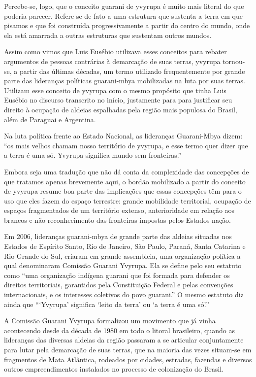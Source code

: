 Percebe-se, logo, que o conceito guarani de yvyrupa é muito mais literal
do que poderia parecer. Refere-se de fato a uma estrutura que sustenta
a terra em que pisamos e que foi construída progressivamente a partir
do centro do mundo, onde ela está amarrada a outras estruturas que
sustentam outros mundos.

Assim como vimos que Luis Eusébio utilizava esses conceitos para rebater
argumentos de pessoas contrárias à demarcação de suas terras, yvyrupa
tornou-se, a partir das últimas décadas, um termo utilizado
frequentemente por grande parte das lideranças políticas guarani-mbya
mobilizadas na luta por suas terras. Utilizam esse conceito de yvyrupa
com o mesmo propósito que tinha Luis Eusébio no discurso transcrito no 
início, justamente para para justificar seu direito à ocupação de
aldeias espalhadas pela região mais populosa do Brasil, além de
Paraguai e Argentina.

Na luta política frente ao Estado Nacional, as lideranças Guarani-Mbya
dizem: ``os mais velhos chamam nosso território de yvyrupa, e esse termo
quer dizer que a terra é uma só. Yvyrupa significa mundo sem
fronteiras.''

Embora seja uma tradução que não dá conta da complexidade das concepções
de que tratamos apenas brevemente aqui, o bordão mobilizado a partir do
conceito de yvyrupa resume boa parte das implicações que essas
concepções têm para o uso que eles fazem do espaço terrestre: grande
mobilidade territorial, ocupação de espaços fragmentados de um
território extenso, anterioridade em relação aos brancos e não
reconhecimento das fronteiras impostas pelos Estados-nação.

Em 2006, lideranças guarani-mbya de grande parte das aldeias situadas
nos Estados de Espírito Santo, Rio de Janeiro, São Paulo, Paraná, Santa
Catarina e Rio Grande do Sul, criaram em grande assembleia, uma
organização política a qual denominaram Comissão Guarani Yvyrupa. Ela
se define pelo seu estatuto como ``uma organização indígena guarani que
foi formada para defender os direitos territoriais, garantidos pela
Constituição Federal e pelas convenções internacionais, e os interesses
coletivos do povo guarani.'' O mesmo estatuto diz ainda que ``‘Yvyrupa’ 
significa ‘leito da terra’ ou ‘a terra é uma só’.''

A Comissão Guarani Yvyrupa formalizou um movimento que já vinha
acontecendo desde da década de 1980 em todo o litoral brasileiro,
quando as lideranças das diversas aldeias da região passaram a se
articular conjuntamente para lutar pela demarcação de suas terras, que
na maioria das vezes situam-se em fragmentos de Mata Atlântica,
rodeados por cidades, estradas, fazendas e diversos outros
empreendimentos instalados no processo de colonização do Brasil.

